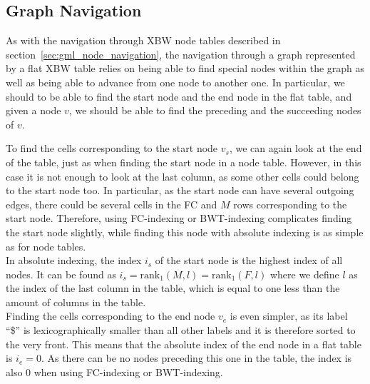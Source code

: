 \documentclass[a4paper,12pt,twoside,BCOR=10mm]{scrbook}
\begin{document}
\subsection{Graph Navigation}

As with the navigation through XBW node tables described in section~\ref{sec:gml_node_navigation},
the navigation through a graph represented by a flat XBW table relies on
being able to find special nodes within the graph
as well as being able to advance from one node to another one.
In particular, we should to be able to find the start node and the end node in the flat table,
and given a node $ v $, we should be able to find the preceding and the succeeding nodes of $ v $.

To find the cells corresponding to the start node $ v_s $, we can again look at the end of the table,
just as when finding the start node in a node table.
However, in this case it is not enough to look at the last column, as some other cells could belong
to the start node too. In particular, as the start node can have several outgoing edges,
there could be several cells in the FC and $ M $ rows corresponding to the start node.
Therefore, using FC-indexing or BWT-indexing complicates finding the start node slightly,
while finding this node with absolute indexing is as simple as for node tables. \\
In absolute indexing, the index $ i_s $ of the start node is the highest index of all nodes.
It can be found as $ i_s \boldsymbol{=} \textrm{rank}_1 ( M, l ) \boldsymbol{=} \textrm{rank}_1 ( F, l ) $ where we
define $ l $ as the index of the last column in the table,
which is equal to one less than the amount of columns in the table. \\
Finding the cells corresponding to the end node $ v_e $ is even simpler, as its label “\$” is
lexicographically smaller than all other labels and it is therefore sorted to the very front.
This means that the absolute index of the end node in a flat table is $ i_e \boldsymbol{=} 0 $.
As there can be no nodes preceding this one in the table, the index is also 0 when using
FC-indexing or BWT-indexing.
\end{document}
